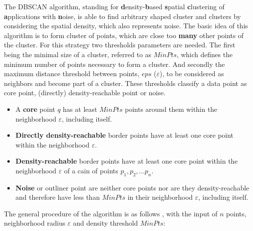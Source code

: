 \documentclass[a4paper,headsepline,footsepline,fontsize=11pt,BCOR=12mm,DIV=12]{report}
\begin{document}
The DBSCAN algorithm, standing for \textbf{d}ensity-\textbf{b}ased \textbf{s}patial \textbf{c}lustering of \textbf{a}pplications with \textbf{n}oise, is able to find arbitrary shaped cluster and clusters by considering the spatial density, which also represents noise. The basic idea of this algorithm is to form cluster of points, which are close too \textbf{many} other points of the cluster. For this strategy two thresholds parameters are needed. The first being the minimal size of a cluster, referred to as $MinPts$, which defines the minimum number of points necessary to form a cluster. And secondly the maximum distance threshold between points, $eps$ ($\varepsilon$), to be considered as neighbors and become part of a cluster. These thresholds classify a data point as core point, (directly) density-reachable point or noise. \cite{Yildirim2020,Chauhan2020,Padro2017}

\begin{itemize}
	\item A \textbf{core} point $q$ has at least $MinPts$ points around them within the neighborhood $\varepsilon$, including itself.
    \item \textbf{Directly density-reachable} border points have at least one core point within the neighborhood $\varepsilon$.
     \item \textbf{Density-reachable} border points have at least one core point within the neighborhood $\varepsilon$ of a cain of points $p_1,p_2,...p_n$.
 	\item \textbf{Noise} or outliner point are neither core points nor are they density-reachable and therefore have less than $MinPts$ in their neighborhood $\varepsilon$, including itself.
\end{itemize}

The general procedure of the algorithm is as follows \cite{Zhao2018}, with the input of $n$ points, neighborhood radius $\varepsilon$ and density threshold $MinPts$:
\end{document}
